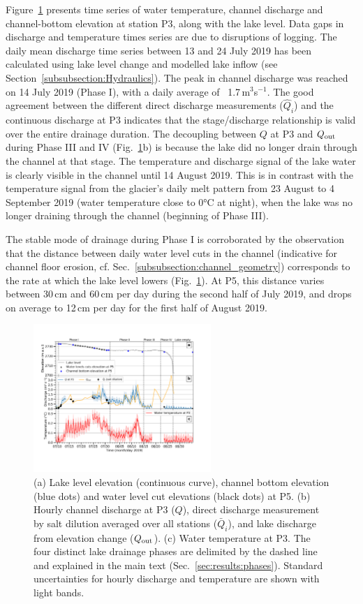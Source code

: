 Figure~\ref{fig:channel_discharge} presents time series of water temperature, channel discharge and channel-bottom elevation at station P3, along with the lake level. Data gaps in discharge and temperature times series are due to disruptions of logging. The daily mean discharge time series between 13 and 24 July 2019 has been calculated using lake level change and modelled lake inflow (see Section~\ref{subsubsection:Hydraulics}). The peak in channel discharge was reached on 14 July 2019 (Phase I), with a daily average of ~1.7\,m$^3$s$^{-1}$. The good agreement between the different direct discharge measurements ($\hat Q_i$) and the continuous discharge at P3 indicates that the stage/discharge relationship is valid over the entire drainage duration. The decoupling between $Q$ at P3 and $Q_{\rm out}$ during Phase III and IV (Fig.~\ref{fig:channel_discharge}b) is because the lake did no longer drain through the channel at that stage. The temperature and discharge signal of the lake water is clearly visible in the channel until 14 August 2019. This is in contrast with the temperature signal from the glacier's daily melt pattern from 23 August to 4 September 2019 (water temperature close to 0°C at night), when the lake was no longer draining through the channel (beginning of Phase III).


The stable mode of drainage during Phase I is corroborated by the observation that the distance between daily water level cuts in the channel (indicative for channel floor erosion, cf. Sec.~\ref{subsubsection:channel_geometry}) corresponds to the rate at which the lake level lowers (Fig.~\ref{fig:channel_discharge}). At P5, this distance varies between 30\,cm and 60\,cm per day during the second half of July 2019, and  drops on average to 12\,cm per day for the first half of August 2019.


\begin{figure}[h]
    \centering
    \includegraphics[width=0.6\textwidth]{chapters/chapter_plainemorte/fig06.pdf}
    \caption{(a) Lake level elevation (continuous curve), channel bottom elevation (blue dots) and water level cut elevations (black dots) at P5. (b) Hourly channel discharge at P3 ($Q$), direct discharge measurement by salt dilution averaged over all stations ($\bar Q_i$), and lake discharge from elevation change ($Q_{\rm out}$). (c) Water temperature at P3. The four distinct lake drainage phases are delimited by the dashed line and explained in the main text (Sec.~\ref{sec:results:phases}). Standard uncertainties for hourly discharge and temperature are shown with light bands.}
    \label{fig:channel_discharge}
\end{figure}

